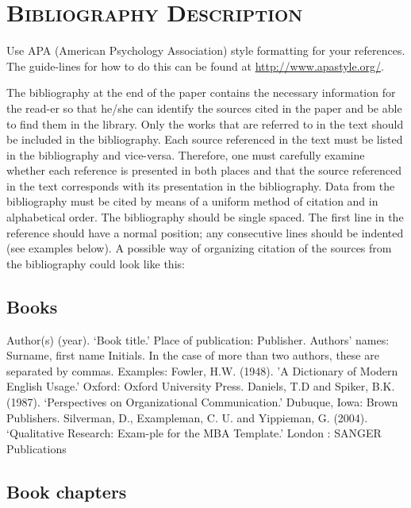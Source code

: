 
\chapter{\textsc{Bibliography Description}}
\label{chap:bibliography}

Use APA (American Psychology Association) style formatting for your references. The guide-lines for how to do this can be found at \url{http://www.apastyle.org/}.

The bibliography at the end of the paper contains the necessary information for the read-er so that he/she can identify the sources cited in the paper and be able to find them in the library. Only the works that are referred to in the text should be included in the bibliography. Each source referenced in the text must be listed in the bibliography and vice-versa. Therefore, one must carefully examine whether each reference is presented in both places and that the source referenced in the text corresponds with its presentation in the bibliography. Data from the bibliography must be cited by means of a uniform method of citation and in alphabetical order. The bibliography should be single spaced. The first line in the reference should have a normal position; any consecutive lines should be indented (see examples below). A possible way of organizing citation of the sources from the bibliography could look like this:

\section{Books}
\label{sec:books}

Author(s) (year). ‘Book title.’ Place of publication: Publisher.
Authors’ names: Surname, first name Initials. In the case of more than two authors, these are separated by commas. 
Examples:
Fowler, H.W. (1948). ’A Dictionary of Modern English Usage.’ Oxford: Oxford University Press.
Daniels, T.D and Spiker, B.K. (1987). ‘Perspectives on Organizational Communication.’ Dubuque, Iowa: Brown Publishers.
Silverman, D., Exampleman, C. U. and Yippieman, G. (2004). ‘Qualitative Research: Exam-ple for the MBA Template.’ London : SANGER Publications


\section{Book chapters}
\label{sec:bookchapters}


